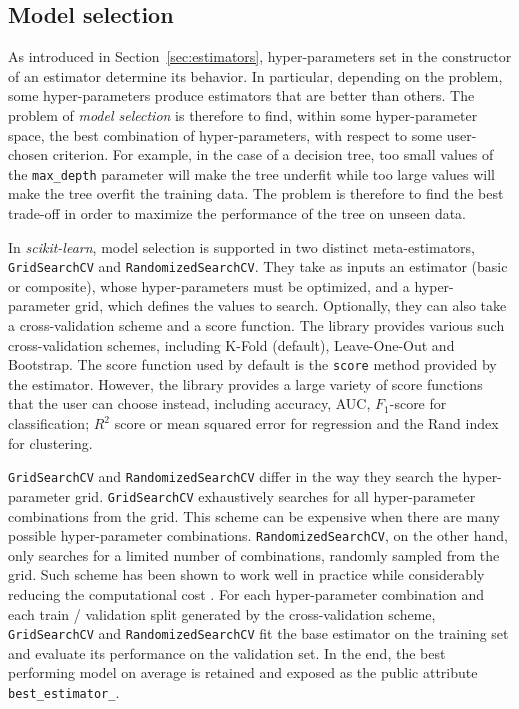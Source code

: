 \documentclass{llncs}
\newcommand{\sklearn}{\textit{scikit-learn}\xspace}
\begin{document}
\subsection{Model selection}

As introduced in Section~\ref{sec:estimators}, hyper-parameters set in the
constructor of an estimator determine its behavior. In particular, depending on
the problem, some hyper-parameters produce estimators that are better than
others. The problem of \textit{model selection} is therefore to find, within
some hyper-parameter space, the best combination of hyper-parameters, with
respect to some user-chosen criterion. For example, in the case of a decision
tree, too small values of the \texttt{max\_depth} parameter will make the tree
underfit while too large values will make the tree overfit the training data.
The problem is therefore to find the best trade-off in order to maximize
the performance of the tree on unseen data.

In \sklearn, model selection is supported in two distinct meta-estimators,
\texttt{GridSearchCV} and \texttt{RandomizedSearchCV}.  They take as inputs an
estimator (basic or composite), whose hyper-parameters must be optimized, and a
hyper-parameter grid, which defines the values to search. Optionally, they can
also take a cross-validation scheme and a score function.  The library provides
various such cross-validation schemes, including K-Fold (default), Leave-One-Out
and Bootstrap. The score function used by default is the \texttt{score} method
provided by the estimator. However, the library provides a large variety of
score functions that the user can choose instead,
including accuracy, AUC, $F_1$-score for classification;
$R^2$ score or mean squared error for regression
and the Rand index for clustering.

\texttt{GridSearchCV} and \texttt{RandomizedSearchCV} differ in the way they
search the hyper-parameter grid.  \texttt{GridSearchCV} exhaustively searches
for all hyper-parameter combinations from the grid. This scheme can be expensive
when there are many possible hyper-parameter combinations.
\texttt{RandomizedSearchCV}, on the other hand, only searches for a limited
number of combinations, randomly sampled from the grid. Such scheme has been
shown to work well in practice while considerably reducing the computational
cost \citep{bergstra2012}. For each hyper-parameter combination and each train /
validation split generated by the cross-validation scheme, \texttt{GridSearchCV}
and \texttt{RandomizedSearchCV} fit the base estimator on the training set and
evaluate its performance on the validation set.  In the end, the best performing
model on average is retained and exposed as the public attribute
\texttt{best\_estimator\_}.
\end{document}
